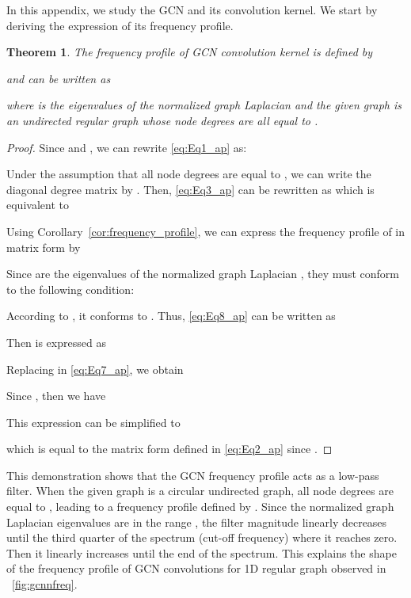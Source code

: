\documentclass{article}
\newtheorem{theorem}{Theorem}
\begin{document}
In this appendix, we study the GCN and its convolution kernel. We start by deriving the expression of its frequency profile.


\begin{theorem}
  \label{Th:th2}
The frequency profile of GCN convolution kernel is defined by

 and can be written as

where  is the eigenvalues of the normalized graph Laplacian and the given graph is an undirected regular graph whose node degrees are all equal to .
\end{theorem}

\begin{proof}
Since  and , we can rewrite \eqref{eq:Eq1_ap} as:

Under the assumption that all node degrees are equal to , we can write the diagonal degree matrix by . Then, \eqref{eq:Eq3_ap} can be rewritten as 
which is equivalent to

Using Corollary~\ref{cor:frequency_profile}, we can express the frequency profile of  in matrix form by 

Since  are the eigenvalues of the normalized graph Laplacian , they must conform to the following condition:

\noindent According to , it conforms to . Thus, \eqref{eq:Eq8_ap} can be written as

\noindent Then  is expressed as

Replacing  in \eqref{eq:Eq7_ap}, we obtain

\noindent Since , then we have

This expression can be simplified to

which is equal to the matrix form defined in \eqref{eq:Eq2_ap} since .
\end{proof}







\medskip

This demonstration shows that the GCN frequency profile acts as a low-pass filter. When the given graph is a circular undirected graph, all node degrees are equal to , leading to a frequency profile defined by . Since the normalized graph Laplacian eigenvalues are in the range , the filter magnitude linearly decreases until the third quarter of the spectrum (cut-off frequency) where it reaches zero. Then it linearly increases until the end of the spectrum. This explains the shape of the frequency profile of GCN convolutions for 1D regular graph observed in \figurename~\ref{fig:gcnnfreq}. 
\end{document}
